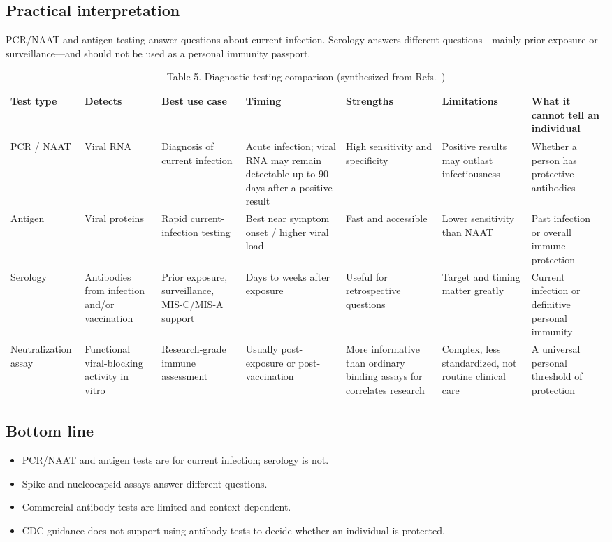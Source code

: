 \documentclass[12pt]{article}
\begin{document}
\subsection*{Practical interpretation}
PCR/NAAT and antigen testing answer questions about current infection. Serology answers different questions---mainly prior exposure or surveillance---and should not be used as a personal immunity passport.

\begin{table}[H]
\centering
\caption{Table 5. Diagnostic testing comparison (synthesized from Refs.~\cite{ref1,ref2,ref7,ref8})}
\begin{tabularx}{\textwidth}{>{\raggedright\arraybackslash}p{1.8cm} >{\raggedright\arraybackslash}p{2.0cm} >{\raggedright\arraybackslash}p{2.2cm} >{\raggedright\arraybackslash}p{1.7cm} >{\raggedright\arraybackslash}p{2.1cm} >{\raggedright\arraybackslash}p{2.1cm} >{\raggedright\arraybackslash}X}
\toprule
Test type & Detects & Best use case & Timing & Strengths & Limitations & What it cannot tell an individual \\
\midrule
PCR / NAAT & Viral RNA & Diagnosis of current infection & Acute infection; viral RNA may remain detectable up to 90 days after a positive result \cite{ref1} & High sensitivity and specificity & Positive results may outlast infectiousness & Whether a person has protective antibodies \\
Antigen & Viral proteins & Rapid current-infection testing & Best near symptom onset / higher viral load & Fast and accessible & Lower sensitivity than NAAT & Past infection or overall immune protection \\
Serology & Antibodies from infection and/or vaccination & Prior exposure, surveillance, MIS-C/MIS-A support & Days to weeks after exposure & Useful for retrospective questions & Target and timing matter greatly & Current infection or definitive personal immunity \\
Neutralization assay & Functional viral-blocking activity in vitro & Research-grade immune assessment & Usually post-exposure or post-vaccination & More informative than ordinary binding assays for correlates research & Complex, less standardized, not routine clinical care & A universal personal threshold of protection \\
\bottomrule
\end{tabularx}
\end{table}

\subsection*{Bottom line}
\begin{itemize}[leftmargin=1.5em]
    \item PCR/NAAT and antigen tests are for current infection; serology is not.
    \item Spike and nucleocapsid assays answer different questions.
    \item Commercial antibody tests are limited and context-dependent.
    \item CDC guidance does not support using antibody tests to decide whether an individual is protected.
\end{itemize}
\end{document}
